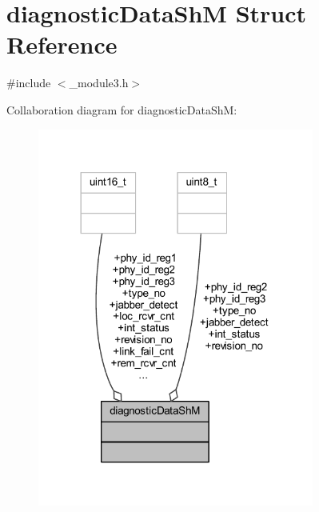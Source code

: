 \hypertarget{structdiagnostic_data_sh_m}{}\section{diagnostic\+Data\+ShM Struct Reference}
\label{structdiagnostic_data_sh_m}


{\ttfamily \#include $<$\+\_\+module3.\+h$>$}



Collaboration diagram for diagnostic\+Data\+ShM\+:
\nopagebreak
\begin{figure}[H]
\begin{center}
\leavevmode
\includegraphics[width=257pt]{structdiagnostic_data_sh_m__coll__graph}
\end{center}
\end{figure}
